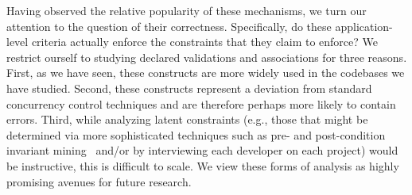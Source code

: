 Having observed the relative popularity of these mechanisms, we turn
our attention to the question of their correctness. Specifically, do
these application-level criteria actually enforce the constraints that
they claim to enforce? We restrict ourself to studying declared
validations and associations for three reasons. First, as we have
seen, these constructs are more widely used in the codebases we have
studied. Second, these constructs represent a deviation from standard
concurrency control techniques and are therefore perhaps more likely
to contain errors. Third, while analyzing latent constraints (e.g.,
those that might be determined via more sophisticated techniques such
as pre- and post-condition invariant
mining~\cite{writes-forest,redblue-new} and/or by interviewing each
developer on each project) would be instructive, this is difficult to
scale. We view these forms of analysis as highly promising avenues for
future research.

